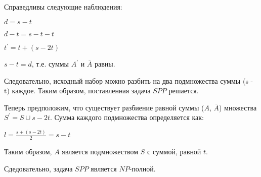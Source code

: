 \documentclass[bachelor, och, labwork]{shiza}
\begin{document}
\begin{enumerate}
    Справедливы следующие наблюдения:

    \begin{center}
      $d = s - t$
    
      $d - t = s - t - t$
    
      $t^{'} = t + (s - 2t)$
    
      $s - t = d$, т.е. суммы $A^{'}$ и $\overline{A}$ равны.
    
      \end{center}

      Следовательно, исходный набор можно разбить на два подмножества суммы (s - t) каждое. Таким образом, поставленная задача $SPP$ решается. 

      Теперь предположим, что существует разбиение равной суммы ($A$, $\overline{A}$) множества $S^{'} = S \cup {s - 2t}$. 
      Сумма каждого подмножества определяется как:

      \begin{center}
        $l = \frac{s + (s - 2t)}{2} = s - t$
      \end{center}
    
      Таким образом, $A$ является подмножеством $S$ с суммой, равной $t$.

      Сдедовательно, задача $SPP$ является $NP$-полной.

  \end{enumerate}



  
  
  
\end{document}

